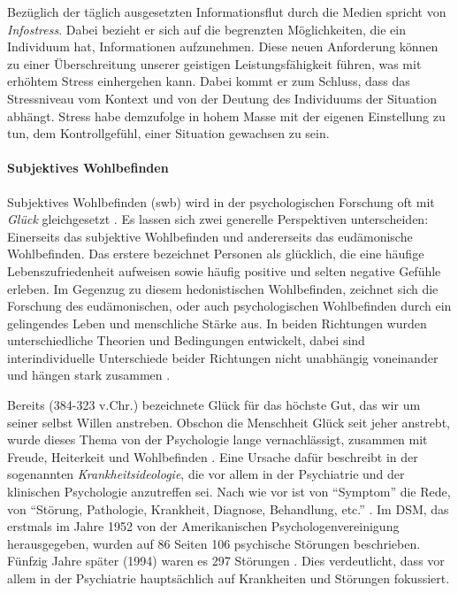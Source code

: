Bezüglich der täglich ausgesetzten Informationsflut durch die Medien spricht  von \textit{Infostress}. Dabei bezieht er sich auf die begrenzten Möglichkeiten, die ein Individuum hat, Informationen aufzunehmen. Diese neuen Anforderung können zu einer Überschreitung unserer geistigen Leistungsfähigkeit führen, was mit erhöhtem Stress einhergehen kann. Dabei kommt er zum Schluss, dass das Stressniveau vom Kontext und von der Deutung des Individuums der Situation abhängt. Stress habe demzufolge in hohem Masse mit der eigenen Einstellung zu tun, dem Kontrollgefühl, einer Situation gewachsen zu sein.

\paragraph{Subjektives Wohlbefinden}\label{sec:Swb}
Subjektives Wohlbefinden (\acrshort{swb}) wird in der psychologischen Forschung oft mit \textit{Glück} gleichgesetzt \cite{Eid2014}. Es lassen sich zwei generelle Perspektiven unterscheiden: Einerseits das subjektive Wohlbefinden und andererseits das eudämonische Wohlbefinden. Das erstere bezeichnet Personen als glücklich, die eine häufige Lebenszufriedenheit aufweisen sowie häufig positive und selten negative Gefühle erleben. Im Gegenzug zu diesem hedonistischen Wohlbefinden, zeichnet sich die Forschung des eudämonischen, oder auch psychologischen Wohlbefinden durch ein gelingendes Leben und menschliche Stärke aus. In beiden Richtungen wurden unterschiedliche Theorien und Bedingungen entwickelt, dabei sind interindividuelle Unterschiede beider Richtungen nicht unabhängig voneinander und hängen stark zusammen \cite{Eid2014}.

Bereits  (384-323 v.Chr.) bezeichnete Glück für das höchste Gut, das wir um seiner selbst Willen anstreben. Obschon die Menschheit Glück seit jeher anstrebt, wurde dieses Thema von der Psychologie lange vernachlässigt, zusammen mit Freude, Heiterkeit und Wohlbefinden \cite{Tugade2014, Gruber2014}. Eine Ursache dafür beschreibt  in der sogenannten \textit{Krankheitsideologie}, die vor allem in der Psychiatrie und der klinischen Psychologie anzutreffen sei. Nach wie vor ist von \enquote{Symptom} die Rede, von \enquote{Störung, Pathologie, Krankheit, Diagnose, Behandlung, etc.} \cite[S.~14]{Maddux2005}. Im DSM, das erstmals im Jahre 1952 von der Amerikanischen Psychologenvereinigung herausgegeben, wurden auf 86 Seiten 106 psychische Störungen beschrieben. Fünfzig Jahre später (1994) waren es 297 Störungen \cite{Bucher2009}. Dies verdeutlicht, dass vor allem in der Psychiatrie hauptsächlich auf Krankheiten und Störungen fokussiert.

